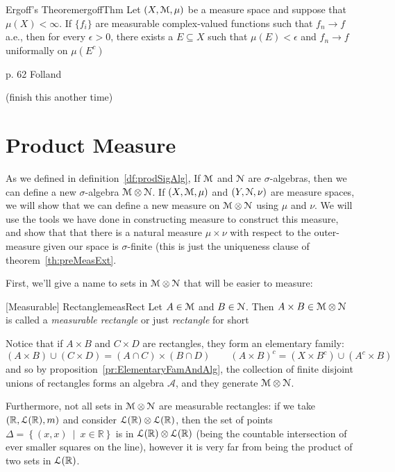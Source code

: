 \documentclass[oneside]{book}
\newcommand{\R}{\mathbb{R}}
\newcommand{\CA}{\mathcal{A}}
\newcommand{\EM}{\EuScript{M}}
\newcommand{\EN}{\EuScript{N}}
\newcommand{\EL}{\EuScript{L}}
\newcommand{\sse}{\subseteq}
\newcommand{\set}[2]{\left\{#1 \ \middle|\ #2\right\}}
\newcommand{\rw}{\rightarrow}
\begin{document}
\begin{thm}{Ergoff's Theorem}{ergoffThm}
	Let $(X, \EM, \mu)$ be a measure space and suppose that $\mu(X) < \infty$. If $\{f_i\}$ are measurable
	complex-valued functions such that $f_n \rw f$ a.e., then for every $\epsilon > 0$, there exists a $E \sse X$ such
	that $\mu(E) < \epsilon$ and $f_n \rw f$ uniformally on $\mu(E^c)$
\end{thm}

\begin{Proof}
	p. 62 Folland
\end{Proof}

(finish this another time)


\section{Product Measure}

As we defined in definition~\ref{df:prodSigAlg}, If $\EM$ and $\EN$ are $\sigma$-algebras, then we can define a new
$\sigma$-algebra $\EM\otimes \EN$. If $(X, \EM, \mu)$ and $(Y, \EN, \nu)$ are measure spaces, we will show that we can
define a new measure on $\EM\otimes \EN$ using $\mu$ and $\nu$. We will use the tools we have done in constructing
measure to construct this measure, and show that that there is a natural measure $\mu\times \nu$ with respect to the
outer-measure given our space is $\sigma$-finite (this is just the uniqueness clause of theorem~\ref{th:preMeasExt}.

First, we'll give a name to sets in $\EM\otimes \EN$ that will be easier to measure:
\begin{defn}{[Measurable] Rectangle}{measRect}
	Let $A \in \EM$ and $B \in \EN$. Then $A\times B \in \EM\otimes \EN$ is called a \emph{measurable rectangle} or just
	\emph{rectangle} for short
\end{defn}

Notice that if $A\times B$ and $C\times D$ are rectangles, they form an elementary family:
\[
	(A\times B)\cup (C\times D) = (A\cap C)\times (B\cap D) \qquad (A\times B)^c = (X\times B^c) \cup(A^c\times B)
\]
and so by proposition~\ref{pr:ElementaryFamAndAlg}, the collection of finite disjoint unions of rectangles forms an
algebra $\CA$, and they generate $\EM\otimes \EN$.

Furthermore, not all sets in $\EM\otimes \EN$ are measurable rectangles: if we take $(\R, \EL(\R), m)$ and consider
$\EL(\R)\otimes \EL(\R)$, then the set of points $\Delta = \set{(x,x)}{x \in \R}$ is in $\EL(\R)\otimes \EL(\R)$ (being
the countable intersection of ever smaller squares on the line), however it is very far from being the product of two
sets in $\EL(\R)$. 
\end{document}
